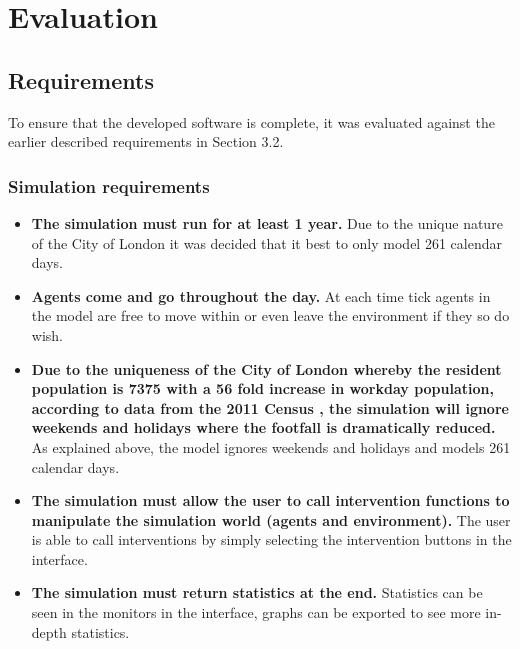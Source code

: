 \documentclass[11pt]{informatics-report}
\begin{document}
\chapter{Evaluation}
\section{Requirements}
To ensure that the developed software is complete, it was evaluated against the earlier described requirements in Section 3.2. 

\subsection{Simulation requirements}
\begin{itemize}
	\item \textbf{The simulation must run for at least 1 year.} Due to the unique nature of the City of London it was decided that it best to only model 261 calendar days.
	\item \textbf{Agents come and go throughout the day.} At each time tick agents in the model are free to move within or even leave the environment if they so do wish.
	\item \textbf{Due to the uniqueness of the City of London whereby the resident population is 7375 with a 56 fold increase in workday population, according to data from the 2011 Census \cite{ons2011}, the simulation will ignore weekends and holidays where the footfall is dramatically reduced.} As explained above, the model ignores weekends and holidays and models 261 calendar days.
	\item \textbf{The simulation must allow the user to call intervention functions to manipulate the simulation world (agents and environment).} The user is able to call interventions by simply selecting the intervention buttons in the interface.
	\item \textbf{The simulation must return statistics at the end.} Statistics can be seen in the monitors in the interface, graphs can be exported to see more in-depth statistics.
\end{itemize}
\end{document}
